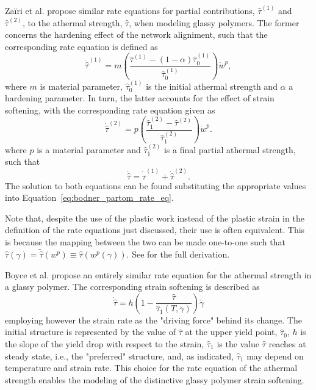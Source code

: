 Zaïri et al. \citep{zairiElastoviscoplasticConstitutiveEquations2007} propose similar rate equations for partial contributions, $\hat \tau^{(1)}$ and $\hat \tau^{(2)}$, to the athermal strength, $\hat \tau$, when modeling glassy polymers.
The former concerns the hardening effect of the network aligniment, such that the corresponding rate equation is defined as
\begin{equation}
  \dot{\hat\tau}^{(1)} = m\left(\frac{\hat\tau^{(1)} - (1 - \alpha)\hat\tau^{(1)}_0}{\hat\tau^{(1)}_0}\right)\dot w^p,
\end{equation}
where $m$ is material parameter, $\hat\tau^{(1)}_0$ is the initial athermal strength and $\alpha$ a hardening parameter.
In turn, the latter accounts for the effect of strain softening, with the corresponding rate equation given as
\begin{equation}
  \dot{\hat\tau}^{(2)} = p\left(\frac{\hat\tau^{(2)}_1 - \hat\tau^{(2)}}{\hat\tau^{(2)}_1}\right)\dot w^p.
\end{equation}
where $p$ is a material parameter and $\hat\tau^{(2)}_1$ is a final partial athermal strength, such that
\begin{equation}
  \label{eq:rate_eq_zairi}
  \dot{\hat \tau} = \dot{\hat\tau}^{(1)} + \dot{\hat\tau}^{(2)}.
\end{equation}
The solution to both equations can be found substituting the appropriate values into Equation~\eqref{eq:bodner_partom_rate_eq}.

Note that, despite the use of the plastic work instead of the plastic strain in the definition of the rate equations just discussed, their use is often equivalent.
This is because the mapping between the two can be made one-to-one such that $\hat \tau(\gamma)=\tilde{\hat \tau}(w^p)\equiv \hat\tau(w^p(\gamma))$.
See \cite{desouzanetoComputationalMethodsPlasticity2008} for the full derivation.

Boyce et al. \cite{boyceLargeInelasticDeformation1988} propose an entirely similar rate equation for the athermal strength in a glassy polymer.
The corresponding strain softening is described as
\begin{equation}
  \label{eq:rate_equation_bpa}
	\dot{\hat \tau}=h \left(1-\frac{\hat \tau}{\hat \tau_{1} \left(T, \dot{\gamma}\right)}\right)\dot{\gamma}
\end{equation}
employing however the strain rate as the "driving force" behind its change.
The initial structure is represented by the value of $\hat \tau$ at the upper yield point, $\hat \tau_0$, $h$ is the slope of the yield drop with respect to the strain, $\hat \tau_1$ is the value $\hat \tau$ reaches at steady state, i.e., the "preferred" structure, and, as indicated, $\hat \tau_1$ may depend on temperature and strain rate.
This choice for the rate equation of the athermal strength enables the modeling of the distinctive glassy polymer strain softening.

